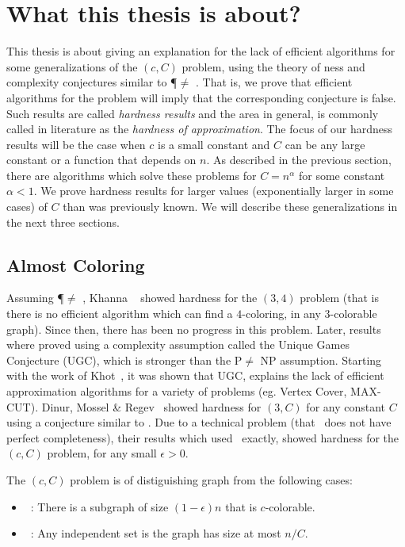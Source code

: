 \section{What this thesis is about?}

This thesis is about giving an explanation for the lack of efficient algorithms for
some generalizations of the \ApproximateGraphColoring$(c,C)$ problem, 
using the theory of \NPComplete ness and complexity conjectures similar 
to \P $\neq$ \NP. That is, we prove that efficient algorithms for the problem
will imply that the corresponding conjecture is false.  
Such results are called \emph{hardness 
results} and the area in general, is commonly called in literature as
the \emph{hardness of approximation}. The focus of our hardness
results will be the case when $c$ is a small constant and $C$ can be 
any large constant or a function that depends on $n$. 
As described in the previous section,
there are algorithms which solve these problems for $C=n^\alpha$ for
some constant $\alpha <1$. We prove hardness results for larger values
(exponentially larger in some cases)
of $C$ than was previously known. 
We will describe these generalizations in the next three sections.

\subsection{Almost Coloring}

Assuming \P$\neq$ \NP, Khanna \etal~\cite{KhannaLS2000}
showed hardness for the \ApproximateGraphColoring$(3,4)$ problem
 (that is there is no efficient algorithm which can find a $4$-coloring,
 in any $3$-colorable graph). Since then, there has been no progress
 in  this problem. Later, results where proved using a complexity
  assumption called the Unique Games Conjecture (UGC), 
  which is stronger than the P$\neq$ NP assumption.
Starting with the work of Khot~\cite{Khot2002}, it was shown that  
UGC, explains the lack of efficient approximation algorithms for a 
variety of problems (eg. Vertex Cover, MAX-CUT).
 Dinur, Mossel \& Regev~\cite{DinurMR2009} showed hardness for
 \ApproximateGraphColoring$(3,C)$ for any constant $C$ using
 a conjecture similar to \UGC. Due to a technical problem (that
 \UGC\ does not have perfect completeness), their results which
 used \UGC\ exactly, showed hardness for the 
 \AlmostGraphColoring{\epsilon}$(c,C)$ problem, for any small
 $\epsilon >0$.
 \begin{definition}
 The \AlmostGraphColoring{\epsilon}$(c,C)$ problem is
 of distiguishing graph from the following cases:
 \begin{itemize}
 \item \YES\ : There is a subgraph of size $(1-\epsilon)n$ that is 
 $c$-colorable.
 \item \NO\ : Any independent set is the graph has size at most $n/C$.
 \end{itemize}
 \end{definition}
 \noindent
